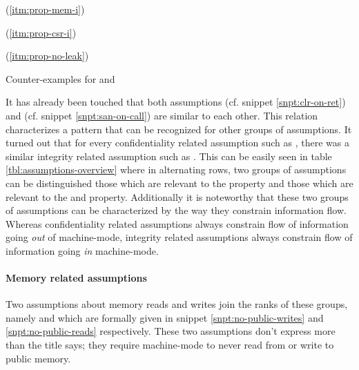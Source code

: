 \begin{table}
    \begin{subtable}{\textwidth}
        \centering
        
        \caption{ (\ref{itm:prop-mem-i})}
        \label{tbl:cex-mem-i-soc}
    \end{subtable}

    \begin{subtable}{\textwidth}
        \centering
        
        \caption{ (\ref{itm:prop-csr-i})}
        \label{tbl:cex-csr-i-soc}
    \end{subtable}

    \begin{subtable}{\textwidth}
        \centering
        
        \caption{ (\ref{itm:prop-no-leak})}
        \label{tbl:cex-no-leak-cor}
    \end{subtable}
    \caption{Counter-examples for  and }
\end{table}

It has already been touched that both assumptions  (cf. snippet \ref{snpt:clr-on-ret}) and  (cf. snippet \ref{snpt:san-on-call}) are similar to each other.
This relation characterizes a pattern that can be recognized for other groups of assumptions.
It turned out that for every confidentiality related assumption such as , there was a similar integrity related assumption such as .
This can be easily seen in table \ref{tbl:assumptions-overview} where in alternating rows, two groups of assumptions can be distinguished those which are relevant to the  property and those which are relevant to the  and  property.
Additionally it is noteworthy that these two groups of assumptions can be characterized by the way they constrain information flow.
Whereas confidentiality related assumptions always constrain flow of information going \textit{out} of machine-mode, integrity related assumptions always constrain flow of information going \textit{in} machine-mode.

\paragraph{Memory related assumptions}
Two assumptions about memory reads and writes join the ranks of these groups, namely  and  which are formally given in snippet \ref{snpt:no-public-writes} and \ref{snpt:no-public-reads} respectively.
These two assumptions don't express more than the title says; they require machine-mode to never read from or write to public memory.

